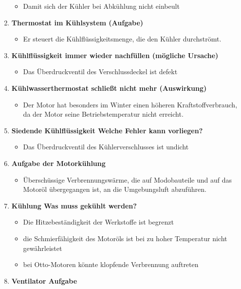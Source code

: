 \begin{enumerate}
  \begin{itemize}
  \item
    Damit sich der Kühler bei Abkühlung nicht einbeult
  \end{itemize}
\item
  \textbf{Thermostat im Kühlsystem (Aufgabe)}

  \begin{itemize}
  \item
    Er steuert die Kühlflüssigkeitsmenge, die den Kühler durchströmt.
  \end{itemize}
\item
  \textbf{Kühlflüssigkeit immer wieder nachfüllen (mögliche Ursache)}

  \begin{itemize}
  \item
    Das Überdruckventil des Verschlussdeckel ist defekt
  \end{itemize}
\item
  \textbf{Kühlwasserthermostat schließt nicht mehr (Auswirkung)}

  \begin{itemize}
  \item
    Der Motor hat besonders im Winter einen höheren Kraftstoffverbrauch,
    da der Motor seine Betriebstemperatur nicht erreicht.
  \end{itemize}
\item
  \textbf{Siedende Kühlflüssigkeit Welche Fehler kann vorliegen?}

  \begin{itemize}
  \item
    Das Überdruckventil des Kühlerverschlusses ist undicht
  \end{itemize}
\item
  \textbf{Aufgabe der Motorkühlung}

  \begin{itemize}
  \item
    Überschüssige Verbrennungswärme, die auf Modobauteile und auf das
    Motoröl übergegangen ist, an die Umgebungsluft abzuführen.
  \end{itemize}
\item
  \textbf{Kühlung Was muss gekühlt werden?}

  \begin{itemize}
  \item
    Die Hitzebeständigkeit der Werkstoffe ist begrenzt
  \item
    die Schmierfähigkeit des Motoröls ist bei zu hoher Temperatur nicht
    gewährleistet
  \item
    bei Otto-Motoren könnte klopfende Verbrennung auftreten
  \end{itemize}
\item
  \textbf{Ventilator Aufgabe}


\end{enumerate}

